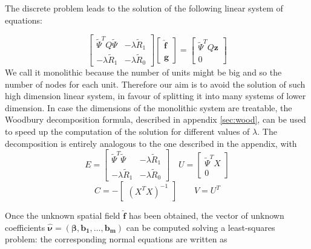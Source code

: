The discrete problem leads to the solution of the following linear system of equations:

\begin{equation}
    \label{mono}
    \begin{bmatrix}
        \tilde{\Psi}^TQ\tilde{\Psi} & -\lambda \tilde{R}_1\\
        -\lambda \tilde{R}_1  & -\lambda \tilde{R}_0
    \end{bmatrix}
    \begin{bmatrix}
        \hat{\mathbf{f}}\\
        \hat{\mathbf{g}}
    \end{bmatrix}
    = 
    \begin{bmatrix}
        \tilde{\Psi}^T Q\mathbf{z}\\
        0
    \end{bmatrix}
\end{equation}
We call it monolithic because the number of units might be big and so the number of nodes for each unit. Therefore our aim is to avoid the solution of such high dimension linear system, in favour of splitting it into many systems of lower dimension.
In case the dimensions of the monolithic system are treatable, the Woodbury decomposition formula, described in appendix \ref{sec:wood}, can be used to speed up the computation of the solution for different values of $\lambda$. The decomposition is entirely analogous to the one described in the appendix, with
\begin{equation}
    \label{eq:wootilde}
    E =
    \begin{bmatrix}
        \tilde{\Psi}^T\tilde{\Psi} & -\lambda \tilde{R}_1\\
        -\lambda \tilde{R}_1  & -\lambda \tilde{R}_0
    \end{bmatrix}
\quad
    U = 
    \begin{bmatrix}
        \tilde{\Psi}^TX\\
        0
    \end{bmatrix}
\end{equation}
\begin{equation*}
    C = -
    \begin{bmatrix}
        \left(X^TX\right)^{-1}
    \end{bmatrix}
\quad \quad
    V = U^T
\end{equation*}

Once the unknown spatial field $\hat{\bm{f}}$ has been obtained, the vector of unknown coefficients $\hat{\bm{\nu}} = (\bm{\beta}, \bm{b_1}, \dots, \bm{b_m})$ can be computed solving a least-squares problem: the corresponding normal equations are written as
    
